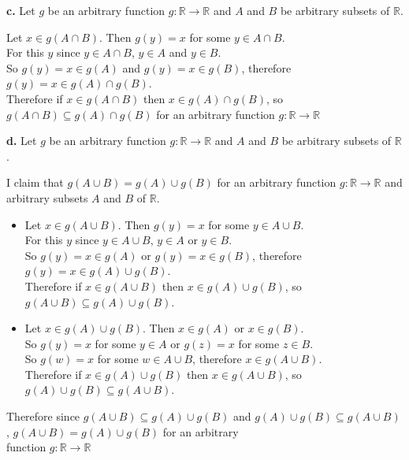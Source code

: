 \documentclass{article}
\begin{document}
{\Large \textbf{c.}} Let $g$ be an arbitrary function $g: \mathbb{R} \rightarrow \mathbb{R}$ and $A$ and $B$ be arbitrary subsets of $\mathbb{R}$.
\begin{center}
    \doublespacing
    Let $x\in g(A\cap B)$. Then $g(y) = x$ for some $y\in A\cap B$.
    \\For this $y$ since $y\in A\cap B$, $y\in A$ and $y\in B$.
    \\So $g(y) = x\in g(A)$ and $g(y) = x\in g(B)$, therefore $g(y) = x\in g(A)\cap g(B)$.
    \\Therefore if $x\in g(A\cap B)$ then $x\in g(A)\cap g(B)$, so $g(A\cap B)\subseteq g(A)\cap g(B)$ for an arbitrary function $g: \mathbb{R} \rightarrow \mathbb{R}$ \qedsymbol
\end{center}

{\Large \textbf{d.}} Let $g$ be an arbitrary function $g: \mathbb{R} \rightarrow \mathbb{R}$ and $A$ and $B$ be arbitrary subsets of $\mathbb{R}$.
\begin{center}
    \doublespacing
    I claim that $g(A\cup B) = g(A)\cup g(B)$ for an arbitrary function $g: \mathbb{R} \rightarrow \mathbb{R}$ and arbitrary subsets $A$ and $B$ of $\mathbb{R}$.
    \begin{itemize}
        \item Let $x\in g(A\cup B)$. Then $g(y) = x$ for some $y\in A\cup B$.
        \\For this $y$ since $y\in A\cup B$, $y\in A$ or $y\in B$.
        \\So $g(y) = x\in g(A)$ or $g(y) = x\in g(B)$, therefore $g(y) = x\in g(A)\cup g(B)$.
        \\Therefore if $x\in g(A\cup B)$ then $x\in g(A)\cup g(B)$, so $g(A\cup B)\subseteq g(A)\cup g(B)$.
        \item Let $x\in g(A)\cup g(B)$. Then $x\in g(A)$ or $x\in g(B)$.
        \\So $g(y) = x$ for some $y\in A$ or $g(z) = x$ for some $z\in B$.
        \\So $g(w) = x$ for some $w\in A\cup B$, therefore $x\in g(A\cup B)$.
        \\Therefore if $x\in g(A)\cup g(B)$ then $x\in g(A\cup B)$, so $g(A)\cup g(B)\subseteq g(A\cup B)$.
    \end{itemize}
    Therefore since $g(A\cup B)\subseteq g(A)\cup g(B)$ and $g(A)\cup g(B)\subseteq g(A\cup B)$, $g(A\cup B) = g(A)\cup g(B)$ for an arbitrary \\function $g: \mathbb{R} \rightarrow \mathbb{R}$ \qedsymbol
\end{center}
\end{document}
